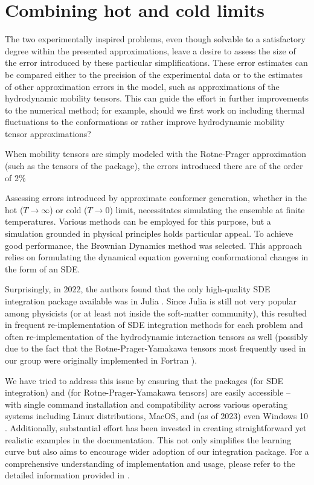 \documentclass{doctoral}
\newcommand{\code}[1]{\texttt{\detokenize{#1}}}
\begin{document}
\section{Combining hot and cold limits}

\label{sec:combining_hot_and_cold_approaches}
The two experimentally inspired problems, even though solvable to a satisfactory degree within the presented approximations, leave a desire to assess the size of the error introduced by these particular simplifications.
These error estimates can be compared either to the precision of the experimental data or to the estimates of other approximation errors in the model, such as approximations of the hydrodynamic mobility tensors.
This can guide the effort in further improvements to the numerical method; for example, should we first work on including thermal fluctuations to the conformations or rather improve hydrodynamic mobility tensor approximations?

When mobility tensors are simply modeled with the Rotne-Prager approximation (such as the tensors of the \code{pygrpy} package), the errors introduced there are of the order of 2\% 

Assessing errors introduced by approximate conformer generation, whether in the hot ($T\to\infty$) or cold ($T\to0$) limit, necessitates simulating the ensemble at finite temperatures.
Various methods can be employed for this purpose, but a simulation grounded in physical principles holds particular appeal.
To achieve good performance, the Brownian Dynamics method was selected.
This approach relies on formulating the dynamical equation governing conformational changes in the form of an SDE.

Surprisingly, in 2022, the authors found that the only high-quality SDE integration package available was \code{differentialequations.jl} in Julia \cite{Rackauckas_2017}.
Since Julia is still not very popular among physicists (or at least not inside the soft-matter community), this resulted in frequent re-implementation of SDE integration methods for each problem and often re-implementation of the hydrodynamic interaction tensors as well (possibly due to the fact that the Rotne-Prager-Yamakawa tensors most frequently used in our group were originally implemented in Fortran \cite{Zuk_2018}).

We have tried to address this issue by ensuring that the packages \code{pychastic} (for SDE integration) and \code{pygrpy} (for Rotne-Prager-Yamakawa tensors) are easily accessible -- with single command installation and compatibility across various operating systems including Linux distributions, MacOS, and (as of 2023) even Windows 10 \cite{jax_on_windows}.
Additionally, substantial effort has been invested in creating straightforward yet realistic examples in the documentation.
This not only simplifies the learning curve but also aims to encourage wider adoption of our integration package.
For a comprehensive understanding of implementation and usage, please refer to the detailed information provided in \textcite{Waszkiewicz_2023_pychastic}.
\end{document}
